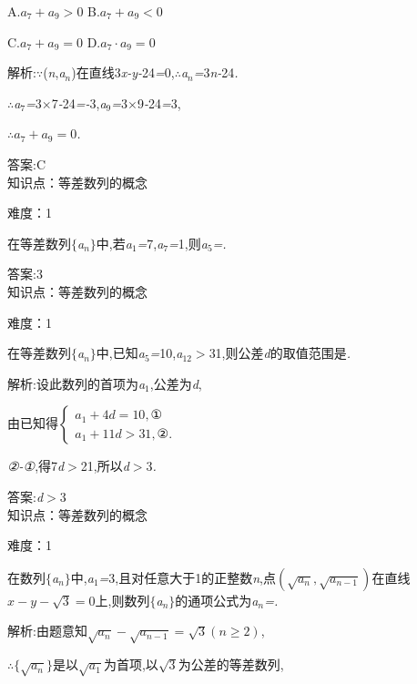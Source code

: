 \documentclass{article} %
\begin{document}
 A.$a_7+a_9>0$ B.$a_7+a_9<0$

 C.$a_7+a_9=0$ D.$a_7 \cdot a_9 = 0$

 解析:\textit{$\because$}(\textit{n},\textit{a${}_{n}$})在直线3\textit{x-y-}24\textit{=}0,\textit{$\therefore$a${}_{n}$=}3\textit{n-}24\textit{.}

\textit{$\therefore$a}${}_{7}$\textit{=}3\textit{$\times$}7\textit{-}24\textit{=-}3,\textit{a}${}_{9}$\textit{=}3\textit{$\times$}9\textit{-}24\textit{=}3,

$\therefore a_7+a_9=0$\textit{.}

 答案:C \\

知识点：等差数列的概念

难度：1

 在等差数列$\mathrm{\{}$\textit{a${}_{n}$}$\mathrm{\}}$中,若\textit{a}${}_{1}$\textit{=}7,\textit{a}${}_{7}$\textit{=}1,则\textit{a}${}_{5}$\textit{=\underbar{　　　　　}.~}

 答案:3 \\

知识点：等差数列的概念

难度：1

 在等差数列$\mathrm{\{}$\textit{a${}_{n}$}$\mathrm{\}}$中,已知\textit{a}${}_{5}$\textit{=}10,\textit{a}${}_{12}$\textit{$>$}31,则公差\textit{d}的取值范围是\textit{\underbar{　　　　　　　　}.~}

 解析:设此数列的首项为\textit{a}${}_{1}$,公差为\textit{d},

由已知得$\left\{
\begin{array}{l}
a_1+4d=10, ① \\
a_1+11d>31,②. 
\end{array}
\right.$

\textit{②-①},得7\textit{d$>$}21,所以\textit{d$>$}3\textit{.}

 答案:\textit{d$>$}3 \\

知识点：等差数列的概念

难度：1

 在数列$\mathrm{\{}$\textit{a${}_{n}$}$\mathrm{\}}$中,\textit{a}${}_{1}$\textit{=}3,且对任意大于1的正整数\textit{n},点$(\sqrt{a_n},\sqrt{a_{n-1}})$在直线$x-y-\sqrt{3} = 0$上,则数列$\mathrm{\{}$\textit{a${}_{n}$}$\mathrm{\}}$的通项公式为\textit{a${}_{n}$=\underbar{　　　　　}.~}

 解析:由题意知$\sqrt{a_n} - \sqrt{a_{n-1}} = \sqrt{3}(n \ge 2)$,

$\therefore \{\sqrt{a_n}\}$是以$\sqrt{a_1}$为首项,以$\sqrt{3}$为公差的等差数列,
\end{document}
